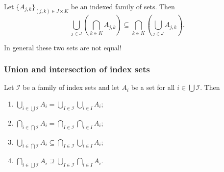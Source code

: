\begin{lemma}
Let $\{A_{j,k}\}_{(j,k) \in J\times K}$ be an indexed family of sets. Then
\[ \bigcup_{j\in J}\left(\bigcap_{k\in K}A_{j,k}\right) \subseteq \bigcap_{k\in K}\left(\bigcup_{j\in J}A_{j,k}\right). \]
\end{lemma}
In general these two sets are not equal!

\subsubsection{Union and intersection of index sets}

\begin{lemma} \label{unionIntersectionLabelSet}
Let $\mathcal{I}$ be a family of index sets and let $A_i$ be a set for all $i\in \bigcup \mathcal{I}$. Then
\begin{enumerate}
\item $\bigcup_{i\in \bigcup \mathcal{I}} A_i = \bigcup_{I\in \mathcal{I}}\bigcup_{i\in I} A_i$;
\item $\bigcap_{i\in \bigcap \mathcal{I}} A_i = \bigcap_{I\in \mathcal{I}}\bigcap_{i\in I} A_i$;
\item $\bigcup_{i\in \bigcap \mathcal{I}} A_i \subseteq \bigcap_{I\in \mathcal{I}}\bigcup_{i\in I} A_i$;
\item $\bigcap_{i\in \bigcup \mathcal{I}} A_i \supseteq \bigcup_{I\in \mathcal{I}}\bigcap_{i\in I} A_i$.
\end{enumerate}
\end{lemma}
